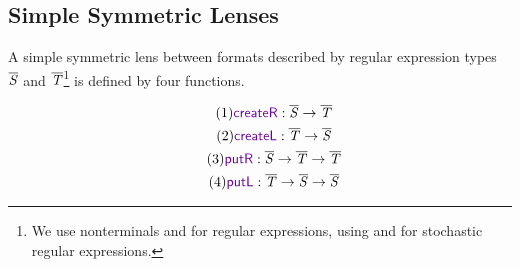\documentclass[acmsmall,screen,anonymous]{acmart}
\begin{document}
%

\subsection{Simple Symmetric Lenses}
A simple symmetric lens between formats described by regular expression types
$\overline{\mathit{S}}$ and $\overline{\mathit{T}}$\footnote{We use nonterminals \BRegex and \BRegexAlt
  for regular expressions, using \Regex and \RegexAlt for stochastic regular
  expressions.} is defined by four functions. 


\begin{gather}
 \tag{1}
 \mbox{$\CreateR \OfType \BRegex \rightarrow \BRegexAlt$}\\
 \tag{2}
 \mbox{$\CreateL \OfType \BRegexAlt \rightarrow \BRegex$}\\
 \tag{3}
 \mbox{$\PutR \OfType \BRegex \rightarrow \BRegexAlt \rightarrow \BRegexAlt$}\\
 \tag{4}
 \mbox{$\PutL \OfType \BRegexAlt \rightarrow \BRegex \rightarrow \BRegex$}
\end{gather}
\end{document}

